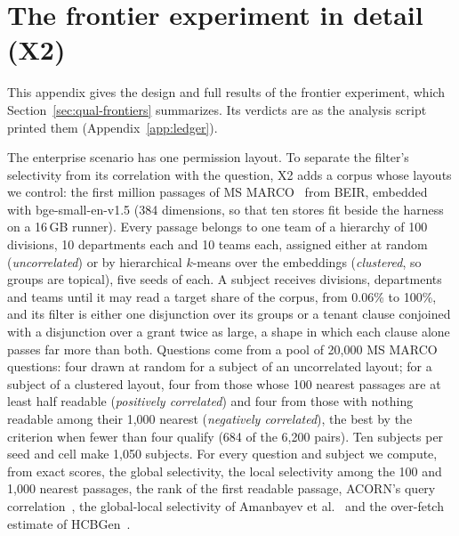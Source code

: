 
\section{The frontier experiment in detail (X2)}\label{app:frontier}

This appendix gives the design and full results of the frontier experiment, which Section~\ref{sec:qual-frontiers}
summarizes. Its verdicts are as the analysis script printed them (Appendix~\ref{app:ledger}).

The enterprise scenario has one permission layout. To separate the filter's selectivity from its
correlation with the question, X2 adds a corpus whose layouts we control: the first million
passages of MS MARCO~\cite{bajaj2016ms} from BEIR, embedded with bge-small-en-v1.5 (384 dimensions,
so that ten stores fit beside the harness on a 16\,GB runner). Every passage belongs to one team of
a hierarchy of 100 divisions, 10 departments each and 10 teams each, assigned either at random
(\emph{uncorrelated}) or by hierarchical $k$-means over the embeddings (\emph{clustered}, so groups
are topical), five seeds of each. A subject receives divisions, departments and teams until it may
read a target share of the corpus, from 0.06\% to 100\%, and its filter is either one disjunction over
its groups or a tenant clause conjoined with a disjunction over a grant twice as large, a shape in
which each clause alone passes far more than both. Questions come from a pool of 20,000 MS MARCO
questions: four drawn at random for a subject of an uncorrelated layout; for a subject of a clustered
layout, four from those whose 100 nearest passages are at least half readable (\emph{positively
correlated}) and four from those with nothing readable among their 1,000 nearest (\emph{negatively
correlated}), the best by the criterion when fewer than four qualify (684 of the 6,200 pairs). Ten subjects per seed and cell make 1,050
subjects. For every question and subject we compute, from exact scores, the global selectivity,
the local selectivity among the 100 and 1,000 nearest passages, the rank of the first readable
passage, ACORN's query correlation~\cite{patel2024acorn}, the global-local selectivity of Amanbayev
et al.~\cite{amanbayev2026filtered} and the over-fetch estimate of HCBGen~\cite{lim2026revisiting}.

